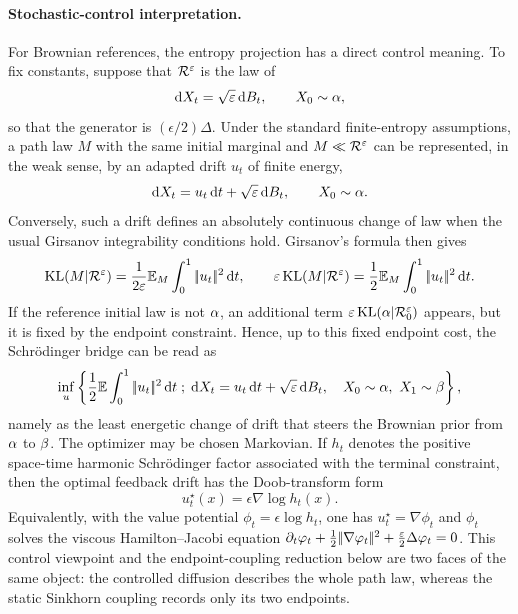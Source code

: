 \paragraph{Stochastic-control interpretation.}
For Brownian references, the entropy projection has a direct control meaning. To fix constants, suppose that $\mathcal{R}^\varepsilon$ is the law of
\[
	\mathrm{d} X_t = \sqrt{\varepsilon}\,\mathrm{d} B_t,
	\qquad
	X_0\sim\alpha ,
\]
so that the generator is $(\epsilon/2)\Delta$. Under the standard finite-entropy assumptions, a path law $M$ with the same initial marginal and $M\ll \mathcal{R}^\varepsilon$ can be represented, in the weak sense, by an adapted drift $u_t$ of finite energy,
\[
	\mathrm{d} X_t = u_t\,\mathrm{d} t+\sqrt{\varepsilon}\,\mathrm{d} B_t,
	\qquad
	X_0\sim\alpha .
\]
Conversely, such a drift defines an absolutely continuous change of law when the usual Girsanov integrability conditions hold. Girsanov's formula then gives
\[
	\operatorname{KL}(M|\mathcal{R}^\varepsilon)
	=
	\frac{1}{2\varepsilon}\mathbb{E}_M\int_0^1 |\!| u_t |\!|^2\,\mathrm{d} t,
	\qquad
	\varepsilon\operatorname{KL}(M|\mathcal{R}^\varepsilon)=\frac12\mathbb{E}_M\int_0^1 |\!| u_t |\!|^2\,\mathrm{d} t .
\]
If the reference initial law is not $\alpha$, an additional term $\varepsilon\operatorname{KL}(\alpha|\mathcal{R}^\varepsilon_0)$ appears, but it is fixed by the endpoint constraint. Hence, up to this fixed endpoint cost, the Schr\"odinger bridge can be read as
\[
	\inf_u
	\left\{ 
		\frac12\mathbb{E}\int_0^1|\!| u_t |\!|^2\,\mathrm{d} t
	 \;;\; 
		\mathrm{d} X_t=u_t\,\mathrm{d} t+\sqrt{\varepsilon}\,\mathrm{d} B_t,\quad
		X_0\sim\alpha,\ X_1\sim\beta
	 \right\},
\]
namely as the least energetic change of drift that steers the Brownian prior from $\alpha$ to $\beta$. The optimizer may be chosen Markovian. If $h_t$ denotes the positive space-time harmonic Schr\"odinger factor associated with the terminal constraint, then the optimal feedback drift has the Doob-transform form
\[
	u_t^\star(x)=\epsilon\nabla\log h_t(x).
\]
Equivalently, with the value potential $\phi_t=\epsilon\log h_t$, one has $u_t^\star=\nabla\phi_t$ and $\phi_t$ solves the viscous Hamilton--Jacobi equation $\partial_t\varphi_t+\frac12|\!| \nabla\varphi_t |\!|^2+\frac{\varepsilon}{2}\Delta\varphi_t=0$. This control viewpoint and the endpoint-coupling reduction below are two faces of the same object: the controlled diffusion describes the whole path law, whereas the static Sinkhorn coupling records only its two endpoints.

